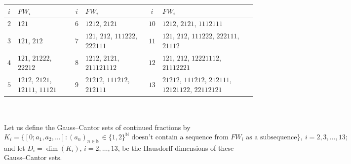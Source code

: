 \documentclass[10pt]{amsart}
\numberwithin{equation}{section}
\theoremstyle{definition}
\begin{document}
\smallskip

    \begin{tabular}{|cl||cl||cl|}
        \hline
        $i$ & $FW_i$  & $i$ & $FW_i$ & $i$ & $FW_i$ \\
        \hline
        $2$ & $121$ &                               $6$ & $1212$, $2121$ &         $10$ & $1212$, $2121$, $1112111$  \\
        $3$ & $121$, $212$ &                        $7$ & $121$, $212$, $111222$, $222111$ &    $11$ & $121$, $212$, $111222$, $222111$, $21112$  \\
        $4$ & $121$, $21222$, $22212$ &             $8$ & $1212$, $2121$, $211121112$ &         $12$ & $121$, $212$, $12221112$, $21112221$ \\
        $5$ & $1212$, $2121$, $12111$, $11121$ &    $9$ & $21212$, $111212$, $212111$ &         $13$ & $21212$, $111212$, $212111$, $12121122$, $22112121$ \\
        \hline
\end{tabular}\\ \\
Let us define the Gauss--Cantor sets of continued fractions by 
$$
K_i = \{[0;a_1,a_2,\dots]: (a_n)_{n\in\mathbb{N}}\in\{1,2\}^{\mathbb{N}}
\mbox{ doesn't contain a sequence from } FW_i \mbox{ as a subsequence} \},
\ i = 2,3, \ldots, 13;
$$ 
and let $D_i=\dim(K_i)$, $i=2,\dots, 13$, be the Hausdorff dimensions of 
these Gauss--Cantor sets.
\end{document}
